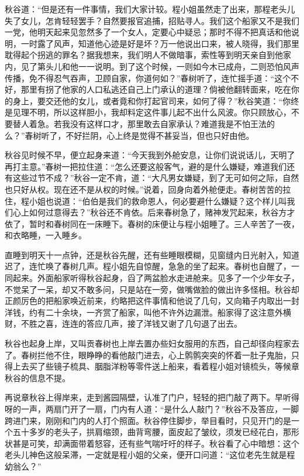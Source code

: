 \documentclass[12pt,UTF8]{ctexbook}
\begin{document}
{{{秋谷道：“但是还有一件事情，我们大家计较。程小姐虽然走了出来，那程老头儿失了女儿，怎肯轻轻罢手？自然要报官追捕，招贴寻人。我们这个船家又不是我们一党，他明天起来见忽然多了一个女人，定要心中疑忌；那时不得不把真话和他说明，一时露了风声，知道他心迹是好是坏？万一他说出口来，被人晓得，我们那里耽得起个拐逃的罪名？据我想来，我们明人不做暗事，索性等到明天亲自到他家内，见了第头儿和他一一说明。到了这个时候，一则如今木已成舟，二则恐怕风声传播，免不得忍气吞声，卫顾自家，你道何如？”春树听了，连忙摇手道：“这个不好，那里有拐了他家的人口私逃还自己上门承认的道理？倘被他翻转面来，吃在你的身上，要交还他的女儿，或者竟和你打起官司来，如何了得？”秋谷笑道：“你终是见理不明，所以这样胆小，我却料定这件事儿起不出什么风波。你只顾放心，不要替人着急。若我没有这样口才，那里敢去自家承认？难道我是不怕王法的么？”春树听了，不好拦阴，心上终是觉得不甚妥当，但也只好由他。

秋谷见时候不早，便立起身来道：“今天我到外舱安息，让你们说说话儿，天明了再打主意。”春树一把拉住道：“怎么还要这般客气，避的是什么嫌疑，难道我们还有这些过节不成？”秋谷一定不肯，道：“大凡男女嫌疑，到了无可如何之际，自然也只好从权。现在还不是从权的时候。”说着，回身向着外舱便走。春树苦苦的拉住，程小姐也说道：“伯伯是我们的救命恩人，何必要避什么嫌疑？这个样儿叫我们心上如何过意得去？”秋谷还不肯依。后来春树急了，赌神发咒起来，秋谷方才依了，暂时和春树同在一床睡下。春树的床便让与程小姐睡了。三人辛苦了一夜，和衣略睡，一入睡乡。

直睡到明天十一点钟，还是秋谷先醒，还有些睡眼模糊，见窗缝内日光射入，知道迟了，连忙唤了春树几声。程小姐先自惊醒，急急的坐了起来。春树也自醒了，一同起来。外面船家听得秋谷起身，舀了两盆脸水走进舱来。见多了一个少年女子，不觉呆了一呆，却又不敢多问，只是站在一旁，做嘴做脸的做出许多怪相。秋谷却正颜厉色的把船家唤近前来，约略把这件事情和他说了几句，又向箱子内取出一封洋钱，约有二十余块，一齐赏了船家，叫他不许外边漏泄。船家得了这注意外横财，不胜之喜，连连的答应几声，接了洋钱又谢了几句退了出去。

秋谷也起身上岸，又叫贡春树也上岸去置办些妇女服用的东西，自己却径向程家去了。春树拦他不住，眼睁睁的看他敲门进去，心上鹘鹘突突的怀着一肚子鬼胎，只得上去买了些镜子梳具、胭脂洋粉等零件送上船来，看着程小姐对镜梳头，等候章秋谷的信息不提。

再说章秋谷上得岸来，走到酱园隔壁，认准了门户，轻轻的把门敲了两下。早听得呀的一声，两扇门开了一扇，门内有人道：“是什么人敲门？”秋谷不及答应，一脚跨进门来，刚刚和门内的人打个照面。秋谷停住脚步，举目看时，只见开门的是一个五十多岁的老头子，拱肩缩颈，曲背弯腰，面皮起了皱纹，须发已经花白，那形状甚是可笑，却满面带着怒容，还有些气喘吁吁的样子。秋谷看了心中暗想：这个老头儿神色这般呆滞，一定就是程小姐的父亲，便开口问道：“这位老先生就是程幼翁么？”

}}}
\end{document}
